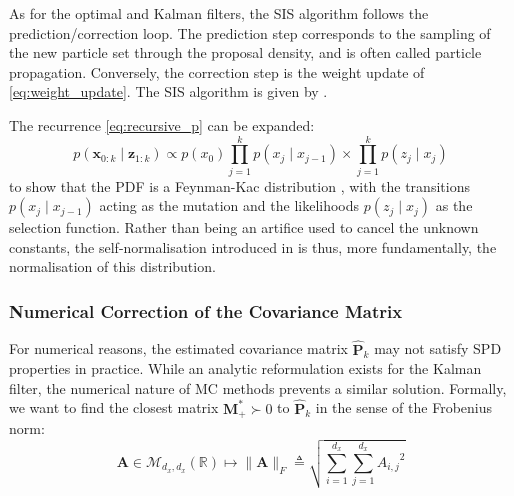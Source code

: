 As for the optimal and Kalman filters, the SIS algorithm follows the prediction/correction loop. The prediction step corresponds to the sampling of the new particle set through the proposal density, and is often called particle propagation. Conversely, the correction step is the weight update of \eqref{eq:weight_update}. The SIS algorithm is given by .

\begin{algorithm}[!htb]
	\begin{algorithmic}
	\end{algorithmic}\caption{Sequential Importance Sampling}\label{alg:SIS}
\end{algorithm}

\begin{remark}
	The recurrence \eqref{eq:recursive_p} can be expanded:
	\begin{equation}
		p(\mathbf{x}_{0:k}\mid\mathbf{z}_{1:k})\propto p(x_0)\prod_{j=1}^kp(x_j\mid x_{j-1})\times\prod_{j=1}^kp(z_j\mid x_j)
	\end{equation}
	to show that the PDF is a Feynman-Kac distribution \cite{bib:Feynman-Kac,bib:SOD333-FK}, with the transitions $p(x_j\mid x_{j-1})$ acting as the mutation and the likelihoods $p(z_j\mid x_j)$ as the selection function. Rather than being an artifice used to cancel the unknown constants, the self-normalisation introduced in  is thus, more fundamentally, the normalisation of this distribution.
\end{remark}

\subsubsection{Numerical Correction of the Covariance Matrix}\label{sec:covariance_correction}

For numerical reasons, the estimated covariance matrix $\hat{\mathbf{P}}_k$ may not satisfy SPD properties in practice. While an analytic reformulation exists for the Kalman filter, the numerical nature of MC methods prevents a similar solution. Formally, we want to find the closest matrix $\mathbf{M}_+^*\succ0$ to $\hat{\mathbf{P}}_k$ in the sense of the Frobenius norm:
\begin{equation}
	\mathbf{A}\in\mathcal{M}_{d_x,d_x}(\mathbb{R})\mapsto\|\mathbf{A}\|_F\triangleq\sqrt{\sum_{i=1}^{d_x}\sum_{j=1}^{d_x}{A_{i,j}}^2}
\end{equation}

